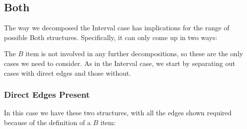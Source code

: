 
\subsection{Both}
The way we decomposed the Interval case has implications for the range of possible Both structures.
Specifically, it can only come up in two ways:


The $B$ item is not involved in any further decompositions, so these are the only cases we need to consider.
As in the Interval case, we start by separating out cases with direct edges and those without.

\subsubsection{Direct Edges Present}
In this case we have these two structures, with all the edges shown required because of the definition of a $B$ item:

